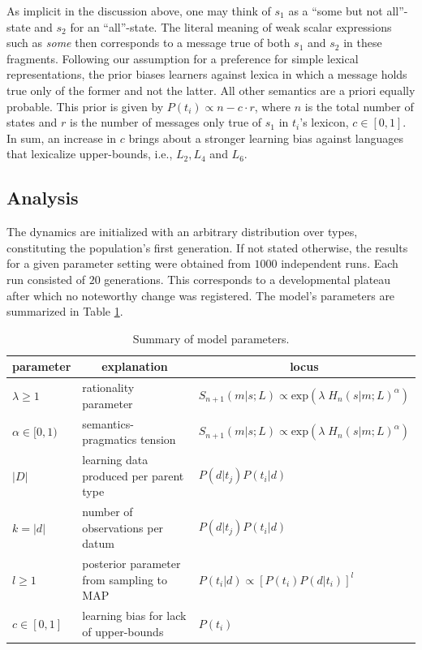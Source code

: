 \documentclass[a4paper]{article}
\begin{document}
As implicit in the discussion above, one may think of $s_1$ as a ``some but not all''-state and $s_2$ for an ``all''-state. The literal meaning of weak scalar expressions such as {\em some} then corresponds to a message true of both $s_1$ and $s_2$ in these fragments.  Following our assumption for a preference for simple lexical representations, the prior biases learners against lexica in which a message holds true only of the former and not the latter. All other semantics are a priori equally probable. This prior is given by $P(t_i) \propto n - c \cdot r$, where $n$ is the total number of states and $r$ is the number of messages only true of $s_1$ in $t_i$'s lexicon, $c \in [0,1]$. In sum, an increase in $c$ brings about a stronger learning bias against languages that lexicalize upper-bounds, i.e., $L_2, L_4$ and $L_6$.


\subsection{Analysis}
The dynamics are initialized with an arbitrary distribution over types, constituting the population's first generation. If not stated otherwise, the results for a given parameter setting were obtained from $1000$ independent runs. Each run consisted of $20$ generations. This corresponds to a developmental plateau after which no noteworthy change was registered. The model's parameters are summarized in Table \ref{tab:summary}.

\begin{table}
\centering
\begin{tabular}{l|l|l}
    \multicolumn{1}{c}{parameter} & \multicolumn{1}{c}{explanation} & \multicolumn{1}{c}{locus}\\ \hline
    $\lambda \geq 1$ & rationality parameter & $S_{n+1}(m|s;L) \propto \text{exp}(\lambda \; H_{n}(s|m;L)^\alpha)$\\
    $\alpha \in [0,1)$ & semantics-pragmatics tension & $S_{n+1}(m|s;L) \propto \text{exp}(\lambda \; H_{n}(s|m;L)^\alpha)$\\ 
    $|D|$ & learning data produced per parent type & $P(d|t_j)P(t_i|d)$\\
    $k = |d|$ & number of observations per datum& $P(d|t_j)P(t_i|d)$\\
    $l \geq 1$ & posterior parameter from sampling to MAP & $P(t_i|d) \propto [P(t_i)P(d|t_i)]^l$\\
    $c \in [0,1]$ & learning bias for lack of upper-bounds &  $P(t_i)$
\end{tabular}
\caption{Summary of model parameters.} 
\label{tab:summary}
\end{table}
\end{document}
